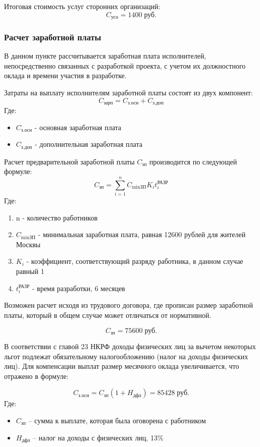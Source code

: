 \documentclass[russian,utf8,emptystyle]{eskdtext}
\begin{document}
\begin{spacing}{1.5}
Итоговая стоимость услуг сторонних организаций:
$$
C_\text{усо} = 1400 \; \text{руб.}
$$

\subsubsection{Расчет заработной платы}
В данном пункте рассчитывается заработная плата исполнителей, непосредственно связанных с разработкой проекта, с учетом их должностного оклада и времени участия в разработке. 

Затраты на выплату исполнителям заработной платы состоят из двух компонент:
$$
C_\text{зарп} = C_\text{з.осн} + C_\text{з.доп}
$$
Где:
\begin{itemize}
\item $C_\text{з.осн}$ - основная заработная плата
\item $C_\text{з.доп}$ - дополнительная заработная плата
\end{itemize}

Расчет предварительной заработной платы $C_\text{зп}$ производится по следующей формуле:
$$
C_\text{зп} = \sum_{i=1}^n C_\text{minЗП} K_i t_i^\text{РАЗР}
$$
Где:
\begin{enumerate}
\item n - количество работников
\item $C_\text{minЗП}$ - минимальная заработная плата, равная 12600 рублей для жителей Москвы
\item $K_i$ - коэффициент, соответствующий разряду работника, в данном случае равный 1
\item $t_i^\text{РАЗР}$ - время разработки, 6 месяцев
\end{enumerate}
Возможен расчет исходя из трудового договора, где прописан размер заработной платы, который в общем случае может отличаться от нормативной.

$$
C_\text{зп} = 75600 \; \text{руб.}
$$

В соответствии с главой 23 НКРФ доходы физических лиц за вычетом некоторых льгот подлежат обязательному налогообложению (налог на доходы физических лиц). Для компенсации выплат размер  месячного оклада увеличивается, что отражено в формуле:

$$
C_\text{з.осн} = C_\text{зп} (1 + H_\text{дфл}) = 85428 \; \text{руб.}
$$
Где:
\begin{itemize}
\item $C_\text{зп}$ -- сумма к выплате, которая была оговорена с работником
\item $H_\text{дфл}$ -- налог на доходы с физических лиц, 13\%
\end{itemize}



\end{spacing}
\end{document}
